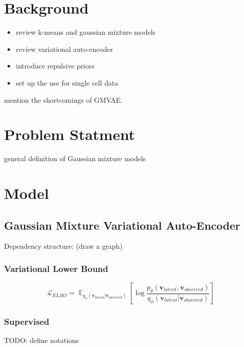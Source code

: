 \documentclass[twoside,11pt]{article}
\DeclareMathOperator{\E}{\mathbb{E}}
\begin{document}
\section{Background}


\begin{itemize}
    \item review k-means and gaussian mixture models
    \item review variational auto-encoder
    \item introduce repulsive priors
    \item set up the use for single cell data
\end{itemize}

mention the shortcomings of GMVAE.

\section{Problem Statment}

general definition of Gaussian mixture models


\section{Model}

\subsection{Gaussian Mixture Variational Auto-Encoder}

Dependency structure: (draw a graph)

\subsubsection{Variational Lower Bound}
\begin{equation} \label{ELBO}
\mathcal{L}_\textit{ELBO} = \E_{q_\phi (
    \bm{v}_\textit{latent} | \bm{v}_\textit{observed})} 
    \left[ \log \frac{p_\theta (\bm{v}_\textit{latent}, 
    \bm{v}_\textit{observed})}{ q_\phi (
    \bm{v}_\textit{latent} | \bm{v}_\textit{observed})} 
    \right]
\end{equation}

\subsubsection{Supervised}

TODO: define notations
\end{document}
